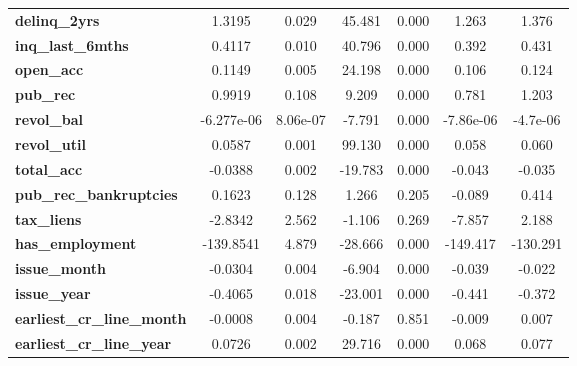 \begin{center}
\begin{tabular}{lcccccc}
\textbf{delinq\_2yrs}                          &       1.3195  &        0.029     &    45.481  &         0.000        &        1.263    &        1.376     \\
\textbf{inq\_last\_6mths}                      &       0.4117  &        0.010     &    40.796  &         0.000        &        0.392    &        0.431     \\
\textbf{open\_acc}                             &       0.1149  &        0.005     &    24.198  &         0.000        &        0.106    &        0.124     \\
\textbf{pub\_rec}                              &       0.9919  &        0.108     &     9.209  &         0.000        &        0.781    &        1.203     \\
\textbf{revol\_bal}                            &   -6.277e-06  &     8.06e-07     &    -7.791  &         0.000        &    -7.86e-06    &     -4.7e-06     \\
\textbf{revol\_util}                           &       0.0587  &        0.001     &    99.130  &         0.000        &        0.058    &        0.060     \\
\textbf{total\_acc}                            &      -0.0388  &        0.002     &   -19.783  &         0.000        &       -0.043    &       -0.035     \\
\textbf{pub\_rec\_bankruptcies}                &       0.1623  &        0.128     &     1.266  &         0.205        &       -0.089    &        0.414     \\
\textbf{tax\_liens}                            &      -2.8342  &        2.562     &    -1.106  &         0.269        &       -7.857    &        2.188     \\
\textbf{has\_employment}                       &    -139.8541  &        4.879     &   -28.666  &         0.000        &     -149.417    &     -130.291     \\
\textbf{issue\_month}                          &      -0.0304  &        0.004     &    -6.904  &         0.000        &       -0.039    &       -0.022     \\
\textbf{issue\_year}                           &      -0.4065  &        0.018     &   -23.001  &         0.000        &       -0.441    &       -0.372     \\
\textbf{earliest\_cr\_line\_month}             &      -0.0008  &        0.004     &    -0.187  &         0.851        &       -0.009    &        0.007     \\
\textbf{earliest\_cr\_line\_year}              &       0.0726  &        0.002     &    29.716  &         0.000        &        0.068    &        0.077     \\

\end{tabular}
\end{center}
